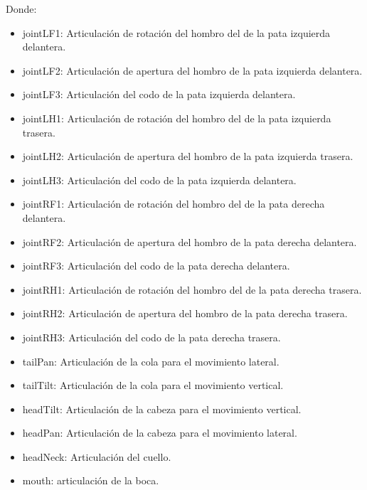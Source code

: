 \documentclass[12pt,a4paper,final,twoside]{book}
\begin{document}
\begin{itemize}
Donde:
\begin{itemize}
\item jointLF1: Articulación de rotación del hombro del de la pata izquierda delantera.
\item jointLF2: Articulación de apertura del hombro de la pata izquierda delantera.
\item jointLF3: Articulación del codo de la pata izquierda delantera.  
\item jointLH1: Articulación de rotación del hombro del de la pata izquierda trasera.     
\item jointLH2: Articulación de apertura del hombro de la pata izquierda trasera.
\item jointLH3: Articulación del codo de la pata izquierda delantera.
\item jointRF1: Articulación de rotación del hombro del de la pata derecha delantera.
\item jointRF2: Articulación de apertura del hombro de la pata derecha delantera.
\item jointRF3: Articulación del codo de la pata derecha delantera.
\item jointRH1: Articulación de rotación del hombro del de la pata derecha trasera.
\item jointRH2: Articulación de apertura del hombro de la pata derecha trasera.
\item jointRH3: Articulación del codo de la pata derecha trasera.
\item tailPan: Articulación de la cola para el movimiento lateral.
\item tailTilt: Articulación de la cola para el movimiento vertical.
\item headTilt: Articulación de la cabeza para el movimiento vertical.
\item headPan: Articulación de la cabeza para el movimiento lateral.
\item headNeck: Articulación del cuello.
\item mouth: articulación de la boca.


\end{itemize}
\end{itemize}
\end{document}
